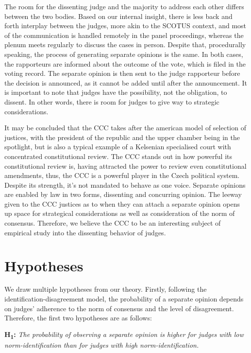 \documentclass[
  11pt,
]{article}
\begin{document}
The room for the dissenting judge and the majority to address each other
differs between the two bodies. Based on our internal insight, there is
less back and forth interplay between the judges, more akin to the
SCOTUS context, and most of the communication is handled remotely in the
panel proceedings, whereas the plenum meets regularly to discuss the
cases in person. Despite that, procedurally speaking, the process of
generating separate opinions is the same. In both cases, the rapporteurs
are informed about the outcome of the vote, which is filed in the voting
record. The separate opinion is then sent to the judge rapporteur before
the decision is announced, as it cannot be added until after the
announcement. It is important to note that judges have the possibility,
not the obligation, to dissent. In other words, there is room for judges
to give way to strategic considerations.

It may be concluded that the CCC takes after the american model of
selection of justices, with the president of the republic and the upper
chamber being in the spotlight, but is also a typical example of a
Kelsenian specialised court with concentrated constitutional review. The
CCC stands out in how powerful its constitutional review is, having
attracted the power to review even constitutional amendments, thus, the
CCC is a powerful player in the Czech political system. Despite its
strength, it's not mandated to behave as one voice. Separate opinions
are enabled by law in two forms, dissenting and concurring opinion. The
leeway given to the CCC justices as to when they can attach a separate
opinion opens up space for strategical considerations as well as
consideration of the norm of consensus. Therefore, we believe the CCC to
be an interesting subject of empirical study into the dissenting
behavior of judges.

\hypertarget{hypotheses}{%
\section{Hypotheses}\label{hypotheses}}

We draw multiple hypotheses from our theory. Firstly, following the
identification-disagreement model, the probability of a separate opinion
depends on judges' adherence to the norm of consensus and the level of
disagreement. Therefore, the first two hypotheses are as follows:

\textbf{H\textsubscript{1}:} \emph{The probability of observing a
separate opinion is higher for judges with low norm-identification than
for judges with high norm-identification.}
\end{document}
